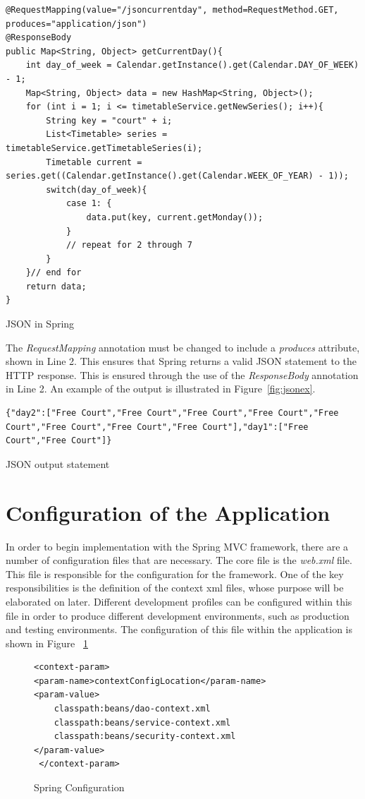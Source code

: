 \begin{lstlisting}
@RequestMapping(value="/jsoncurrentday", method=RequestMethod.GET, produces="application/json")
@ResponseBody
public Map<String, Object> getCurrentDay(){
	int day_of_week = Calendar.getInstance().get(Calendar.DAY_OF_WEEK) - 1;
	Map<String, Object> data = new HashMap<String, Object>();
	for (int i = 1; i <= timetableService.getNewSeries(); i++){
		String key = "court" + i;
		List<Timetable> series = timetableService.getTimetableSeries(i);
		Timetable current = series.get((Calendar.getInstance().get(Calendar.WEEK_OF_YEAR) - 1));
		switch(day_of_week){
			case 1: {
				data.put(key, current.getMonday());
			}
			// repeat for 2 through 7
		}
	}// end for
	return data;
}
\end{lstlisting}
\begin{table}[H]
\caption{JSON in Spring}
\label{fig:json}
\end{table}

The \textit{RequestMapping} annotation must be changed to include a \textit{produces} attribute, shown in Line 2. This ensures that Spring returns a valid JSON statement to the HTTP response. This is ensured through the use of the \textit{ResponseBody} annotation in Line 2.  An example of the output is illustrated in Figure~\ref{fig:jsonex}.

\begin{lstlisting}
{"day2":["Free Court","Free Court","Free Court","Free Court","Free Court","Free Court","Free Court","Free Court"],"day1":["Free Court","Free Court"]}
\end{lstlisting}
\begin{table}
\caption{JSON output statement}
\label{fig:jsonex}
\end{table}



\section{Configuration of the Application}

In order to begin implementation with the Spring MVC framework, there are a number of configuration files that are necessary. The core file is the \textit{web.xml} file. This file is responsible for the configuration for the framework. One of the key responsibilities is the definition of the context xml files, whose purpose will be elaborated on later. Different development profiles can be configured within this file in order to produce different development environments, such as production and testing environments. The configuration of this file within the application is shown in Figure ~\ref{fig:springConfig} \newline 
\begin{figure}[H]
\begin{lstlisting}
<context-param>
<param-name>contextConfigLocation</param-name>
<param-value>
	classpath:beans/dao-context.xml
	classpath:beans/service-context.xml
	classpath:beans/security-context.xml
</param-value>
 </context-param>
\end{lstlisting}
\caption{Spring Configuration}
\label{fig:springConfig}
\end{figure}

